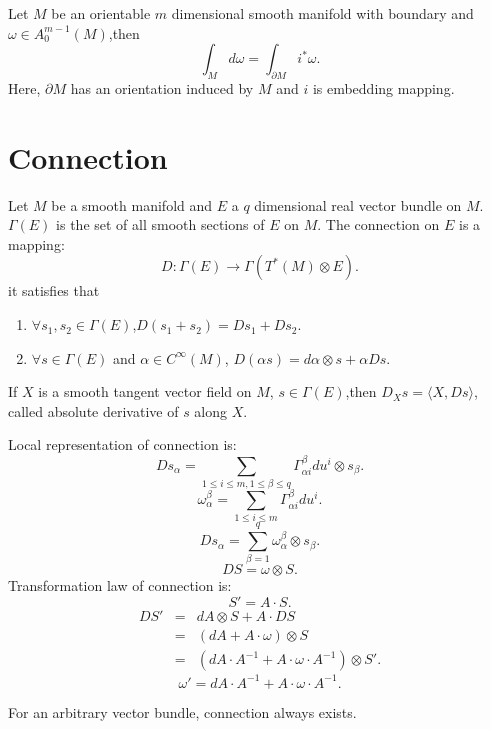 \begin{newthem} 
Let $M$ be an orientable $m$ dimensional smooth manifold with boundary and $\omega \in A_0^{m-1}(M)$,then
\[\int_{M} d\omega = \int_{\partial M} i^* \omega.\]
Here, $\partial M$ has an orientation induced by $M$ and $i$ is  embedding mapping.
\end{newthem}

\section{Connection}
\begin{newdef}[Connection] 
Let $M$ be a smooth manifold and $E$ a $q$ dimensional real vector bundle on $M$. $\Gamma(E)$ is the set of all smooth sections of $E$ on $M$. The connection on $E$ is a mapping:
\[D:\Gamma(E) \to \Gamma(T^*(M) \otimes E).\]
it satisfies that
\begin{enumerate}
\item $\forall s_1 ,s_2 \in \Gamma(E)$,$D(s_1+s_2) = Ds_1+Ds_2$.
\item $\forall s \in \Gamma(E)$ and $\alpha \in C^{\infty}(M)$, $D(\alpha s) = d\alpha \otimes s + \alpha Ds$.
\end{enumerate}
If $X$ is a smooth tangent vector field on $M$, $s \in \Gamma(E)$,then
$D_{X}s = \langle X, Ds \rangle$, called absolute derivative of $s$ along $X$.
\end{newdef}

\vspace{50pt}

\begin{newprop}
Local representation of connection is: 
\[Ds_{\alpha} = \sum_{1 \leq i \leq m,1 \leq \beta \leq q} \Gamma^{\beta}_{\alpha i} du^i \otimes s_{\beta}.\]
\[\omega^{\beta}_{\alpha} = \sum_{1 \leq i \leq m} \Gamma^{\beta}_{\alpha i} du^i.\]
\[Ds_{\alpha} = \sum_{\beta=1}^{q} \omega^{\beta}_{\alpha} \otimes s_{\beta}.\]
\[DS = \omega \otimes S.\]
Transformation law of connection is:
\[S' = A \cdot S.\] 
\begin{eqnarray}
DS' &=& dA \otimes S + A \cdot DS \nonumber \\
&=& (dA + A \cdot \omega) \otimes S \nonumber \\
&=& (dA \cdot A^{-1} + A \cdot \omega \cdot A^{-1}) \otimes S' .\nonumber
\end{eqnarray}
\[\omega' = dA \cdot A^{-1} + A \cdot \omega \cdot A^{-1}.\]
\end{newprop}

\begin{newthem}
For an arbitrary vector bundle, connection always exists.
\end{newthem}

